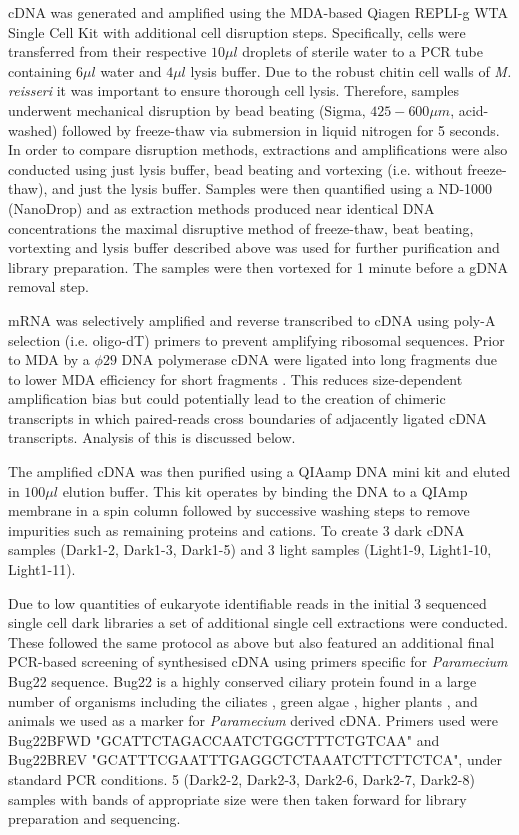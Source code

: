 cDNA was generated and amplified using the MDA-based Qiagen REPLI-g WTA Single Cell Kit \citep{Korfhage2015}
with additional cell disruption steps. 
Specifically, cells were transferred from their respective \(10\mu l\) droplets of sterile water to
a PCR tube containing \(6\mu l\) water and \(4\mu l \) lysis buffer. 
Due to the robust chitin cell walls of \textit{M. reisseri} \citep{Kapaun1995} it was important to
ensure thorough cell lysis. Therefore, samples underwent mechanical disruption by bead beating (Sigma, \(425-600\mu m\), acid-washed)
followed by freeze-thaw via submersion in liquid nitrogen for 5 seconds.
In order to compare disruption methods, extractions and amplifications
were also conducted using just lysis buffer, bead beating and vortexing (i.e. without freeze-thaw), 
and just the lysis buffer.  Samples were then quantified using a ND-1000 (NanoDrop)
and as extraction methods produced near identical DNA concentrations 
the maximal disruptive method of freeze-thaw, beat beating, vortexting and lysis buffer
described above was used for further purification and library preparation.
The samples were then vortexed for 1 minute before a gDNA removal step.

mRNA was selectively amplified and reverse transcribed to cDNA using poly-A selection (i.e. oligo-dT) primers
to prevent amplifying ribosomal sequences. Prior to MDA by a \(\phi29\) DNA polymerase
cDNA were ligated into long fragments due to lower MDA efficiency for short fragments \citep{Korfhage2015}.
This reduces size-dependent amplification bias but could potentially lead to the creation
of chimeric transcripts in which paired-reads cross boundaries of adjacently ligated
cDNA transcripts.  Analysis of this is discussed below.

The amplified cDNA was then purified using a QIAamp DNA mini kit and eluted in \(100\mu l\) elution buffer.
This kit operates by binding the DNA to a QIAmp membrane in a spin column followed by successive washing steps
to remove impurities such as remaining proteins and cations. To create 3 dark cDNA 
samples (Dark1-2, Dark1-3, Dark1-5) and 3 light samples (Light1-9, Light1-10, Light1-11).


Due to low quantities of eukaryote identifiable reads in the initial 3 sequenced single cell
dark libraries a set of additional single cell extractions were conducted. 
These followed the same protocol as above but also featured an additional
final PCR-based screening of synthesised cDNA using primers specific for \textit{Paramecium}
Bug22 sequence. Bug22 is a highly conserved ciliary protein found in a large number of organisms
including the ciliates \citep{Smith2005,Laligne2010}, green algae \citep{Keller2005,Laligne2010,Meng2014}, higher plants \citep{Hodges2011}, and animals \citep{MendesMaia2014} we used as a marker for \textit{Paramecium} derived cDNA.
Primers used were Bug22BFWD "GCATTCTAGACCAATCTGGCTTTCTGTCAA" and Bug22BREV "GCATTTCGAATTTGAGGCTCTAAATCTTCTTCTCA",
under standard PCR conditions.  5 (Dark2-2, Dark2-3, Dark2-6, Dark2-7, Dark2-8) samples with 
bands of appropriate size were then taken forward for library preparation and sequencing.


